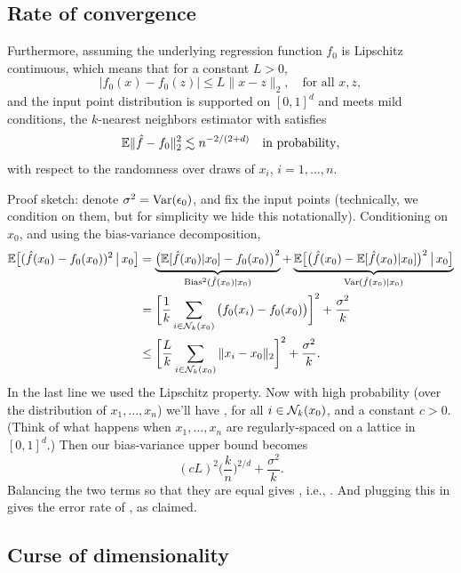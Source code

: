 \documentclass{article}
\begin{document}
\subsection{Rate of convergence}

\def\Bias{\mathrm{Bias}}

Furthermore, assuming the underlying regression function $f_0$ is Lipschitz
continuous, which means that for a constant $L>0$,
\[
|f_0(x) - f_0(z)| \leq L \|x - z\|_2, \quad \text{for all $x,z$},
\]
and the input point distribution is supported on $[0,1]^d$ and meets mild
conditions, the $k$-nearest neighbors estimator with  satisfies   
\begin{equation}
\label{eq:knn_rate}
\mathbb{E}\|\hat{f} - f_0\|_2^2 \lesssim n^{-2/(2+d)} \quad \text{in probability},
\end{equation}
with respect to the randomness over draws of $x_i$, $i=1,\dots,n$.

Proof sketch: denote $\sigma^2 = \mathrm{Var}(\epsilon_0)$, and fix the input points
(technically, we condition on them, but for simplicity we hide this
notationally). Conditioning on $x_0$, and using the bias-variance decomposition,   
\begin{align*}
\E\big[(\hf(x_0) - f_0(x_0))^2 \,\big|\, x_0 \big]  
&= \underbrace{\big( \E[\hf(x_0) | x_0] - f_0(x_0)
\big)^2}_{\Bias^2(\hf(x_0) | x_0)} + 
\underbrace{\E\big[\big( \hf(x_0) - \E[\hf(x_0) | x_0] \big)^2 
\,\big|\, x_0 \big]}_{\Var(\hf(x_0) | x_0)} \\
&= \bigg[ \frac{1}{k} \sum_{i \in \cN_k(x_0)} 
\big( f_0(x_i) - f_0(x_0) \big) \bigg]^2 + \frac{\sigma^2}{k} \\  
&\leq \bigg[ \frac{L}{k} \sum_{i \in \cN_k(x_0)}  
\|x_i - x_0\|_2 \bigg]^2 + \frac{\sigma^2}{k}.
\end{align*}
In the last line we used the Lipschitz property. Now with high probability (over
the distribution of $x_1,\dots,x_n$) we'll have , for all $i \in \mathcal{N}_k(x_0)$, and a constant $c>0$. (Think of
what happens when $x_1,\dots,x_n$ are regularly-spaced on a lattice in
$[0,1]^d$.) Then our bias-variance upper bound becomes 
\[
(cL)^2 \bigg(\frac{k}{n}\bigg)^{2/d} + \frac{\sigma^2}{k}.
\]
Balancing the two terms so that they are equal gives , i.e., . And plugging this in gives
the error rate of , as claimed.  

\subsection{Curse of dimensionality}
\end{document}
